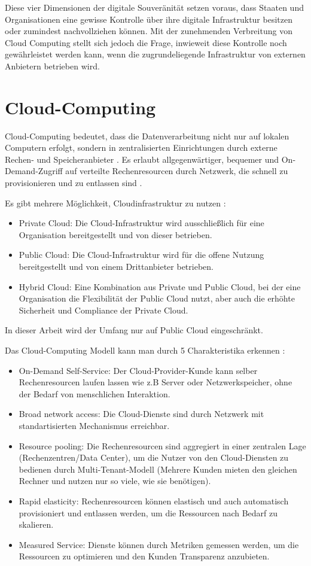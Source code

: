 Diese vier Dimensionen der digitale Souveränität setzen voraus, dass Staaten und 
Organisationen eine gewisse Kontrolle über ihre digitale Infrastruktur besitzen 
oder zumindest nachvollziehen können. Mit der zunehmenden Verbreitung von 
Cloud Computing stellt sich jedoch die Frage, inwieweit diese Kontrolle 
noch gewährleistet werden kann, wenn die zugrundeliegende Infrastruktur 
von externen Anbietern betrieben wird.

\section{Cloud-Computing}
Cloud-Computing bedeutet, dass die Datenverarbeitung nicht nur auf lokalen Computern erfolgt,
sondern in zentralisierten Einrichtungen durch externe Rechen- und Speicheranbieter \cite{magoules2013cloud}.
Es erlaubt allgegenwärtiger, bequemer und On-Demand-Zugriff auf verteilte Rechenresourcen durch Netzwerk, 
die schnell zu provisionieren und zu entlassen sind \cite{mell2011nist}.

Es gibt mehrere Möglichkeit, Cloudinfrastruktur zu nutzen \cite{mell2011nist}:
\begin{itemize}
    \item Private Cloud: Die Cloud-Infrastruktur wird ausschließlich für eine Organisation bereitgestellt und von dieser betrieben.
    \item Public Cloud: Die Cloud-Infrastruktur wird für die offene Nutzung bereitgestellt und von einem Drittanbieter betrieben.
    \item Hybrid Cloud: Eine Kombination aus Private und Public Cloud, bei der eine Organisation die Flexibilität der Public Cloud nutzt, aber auch die erhöhte Sicherheit und Compliance der Private Cloud.
\end{itemize}
In dieser Arbeit wird der Umfang nur auf Public Cloud eingeschränkt.

Das Cloud-Computing Modell kann man durch 5 Charakteristika erkennen \cite{mell2011nist}:
\begin{itemize}
    \item On-Demand Self-Service: Der Cloud-Provider-Kunde kann selber Rechenresourcen laufen lassen wie 
    z.B Server oder Netzwerkspeicher, ohne der Bedarf von menschlichen Interaktion.
    \item Broad network access: Die Cloud-Dienste sind durch Netzwerk mit standartisierten Mechanismus erreichbar.
    \item Resource pooling: Die Rechenresourcen sind aggregiert in einer zentralen Lage (Rechenzentren/Data Center), um die Nutzer von den Cloud-Diensten 
    zu bedienen durch Multi-Tenant-Modell (Mehrere Kunden mieten den gleichen Rechner und nutzen nur so viele, wie sie benötigen).
    \item Rapid elasticity: Rechenresourcen können elastisch und auch automatisch provisioniert und entlassen werden, 
    um die Ressourcen nach Bedarf zu skalieren.
    \item Measured Service: Dienste können durch Metriken gemessen werden, um die Ressourcen zu optimieren und den Kunden Transparenz 
    anzubieten.
\end{itemize}

